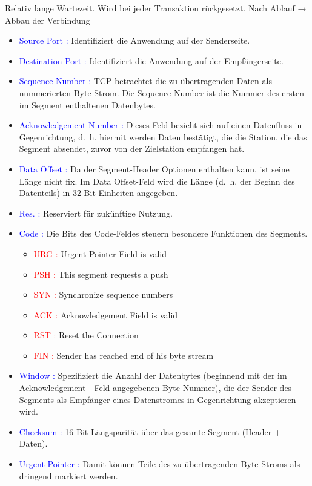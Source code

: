 Relativ lange Wartezeit.
Wird bei jeder Transaktion rückgesetzt.
Nach Ablauf → Abbau der Verbindung

\begin{itemize}
    \item \textcolor{blue}{Source Port :} Identifiziert die Anwendung auf der Senderseite.
    \item \textcolor{blue}{Destination Port :} Identifiziert die Anwendung auf der Empfängerseite.
    \item \textcolor{blue}{Sequence Number :} TCP betrachtet die zu übertragenden Daten als nummerierten Byte-Strom.
    Die Sequence Number ist die Nummer des ersten im Segment enthaltenen Datenbytes.
    \item \textcolor{blue}{Acknowledgement Number :} Dieses Feld bezieht sich auf einen Datenfluss in Gegenrichtung, d.\ h. hiermit werden Daten bestätigt, die die Station, die das Segment absendet, zuvor von der Zielstation empfangen hat.
    \item \textcolor{blue}{Data Offset :} Da der Segment-Header Optionen enthalten kann, ist seine Länge nicht fix.
    Im Data Offset-Feld wird die Länge (d.\ h. der Beginn des Datenteils) in 32-Bit-Einheiten angegeben.
    \item \textcolor{blue}{Res. :} Reserviert für zukünftige Nutzung.
    \item \textcolor{blue}{Code :} Die Bits des Code-Feldes steuern besondere Funktionen des Segments.
    \begin{itemize}
        \item \textcolor{red}{URG :} Urgent Pointer Field is valid
        \item \textcolor{red}{PSH :} This segment requests a push
        \item \textcolor{red}{SYN :} Synchronize sequence numbers
        \item \textcolor{red}{ACK :} Acknowledgement Field is valid
        \item \textcolor{red}{RST :} Reset the Connection
        \item \textcolor{red}{FIN :} Sender has reached end of his byte stream
    \end{itemize}
    \item \textcolor{blue}{Window :} Spezifiziert die Anzahl der Datenbytes (beginnend mit der im Acknowledgement - Feld angegebenen Byte-Nummer), die der Sender des Segments als Empfänger eines Datenstromes in Gegenrichtung akzeptieren wird.
    \item \textcolor{blue}{Checksum :} 16-Bit Längsparität über das gesamte Segment (Header + Daten).
    \item \textcolor{blue}{Urgent Pointer :} Damit können Teile des zu übertragenden Byte-Stroms als dringend markiert werden.
\end{itemize}

